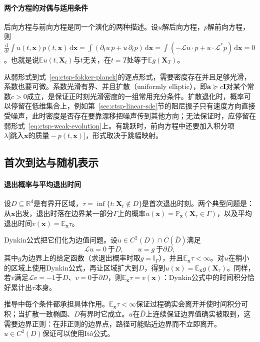 \paragraph{两个方程的对偶与适用条件}
后向方程与前向方程是同一个演化的两种描述。设$u$解后向方程，$p$解前向方程，则$\frac{\mathrm d}{\mathrm dt}\int u(t,\bm x)p(t,\bm x)\,\mathrm d\bm x=\int(\partial_tu\,p+u\,\partial_tp)\,\mathrm d\bm x=\int(-\mathcal Lu\cdot p+u\cdot\mathcal L^*p)\,\mathrm d\bm x=0$。也就是说$\mathbb Eu(t,\bm X_t)$与$t$无关，在$t=T$处等于$\mathbb Eg(\bm X_T)$。

从弱形式到式~\eqref{eq:ctsp-fokker-planck}的逐点形式，需要密度存在并且足够光滑，系数也要可微。系数光滑有界、并且扩散（uniformly elliptic），即$\bm a\succeq c\bm I$对某个常数$c>0$成立，是保证正时刻光滑密度的一组常用充分条件。扩散退化时，概率可以停留在低维集合上，例如第~\ref{sec:ctsp-linear-sde}节的阻尼振子只有速度方向直接受噪声，此时密度是否存在要靠漂移把噪声传到其他方向；无法保证时，应停留在弱形式~\eqref{eq:ctsp-weak-evolution}上。有跳跃时，前向方程中还要加入积分项$\lambda\bigl[\text{跳入}\bm x\text{的质量}-p(t,\bm x)\bigr]$，形式取决于跳幅映射。

\subsection{首次到达与随机表示}
\label{sec:ctsp-first-passage}

\paragraph{退出概率与平均退出时间}
设$D\subseteq\mathbb R^d$是有界开区域，$\tau=\inf\{t:\bm X_t\notin D\}$是首次退出时刻。两个典型问题是：从$\bm x$出发，退出时落在边界某一部分$\Gamma$上的概率$u(\bm x)=\mathbb P_{\bm x}(\bm X_\tau\in\Gamma)$，以及平均退出时间$v(\bm x)=\mathbb E_{\bm x}\tau$。

Dynkin公式把它们化为边值问题。设$u\in C^2(D)\cap C(\bar D)$满足
\begin{equation}
  \mathcal Lu=0\ \text{于}D,\qquad u=g\ \text{于}\partial D ,
  \label{eq:ctsp-exit-bvp}
\end{equation}
其中$g$为边界上的给定函数（求退出概率时取$g=\mathbb I_\Gamma$），并且$\mathbb E_{\bm x}\tau<\infty$。对$u$在稍小的区域上使用Dynkin公式，再让区域扩大到$D$，得到$u(\bm x)=\mathbb E_{\bm x}g(\bm X_\tau)$。同样，若$v$满足$\mathcal Lv=-1$于$D$、$v=0$于$\partial D$，则$\mathbb E_{\bm x}\tau=v(\bm x)$：Dynkin公式中的时间积分恰好累计出$\tau$本身。

推导中每个条件都承担具体作用。$\mathbb E_{\bm x}\tau<\infty$保证过程确实会离开并使时间积分可积；当扩散一致椭圆、$D$有界时它成立。$u$在$\bar D$上连续保证边界值确实被取到，这需要边界正则：在非正则的边界点，路径可能贴近边界而不立即离开。$u\in C^2(D)$保证可以使用Itô公式。

